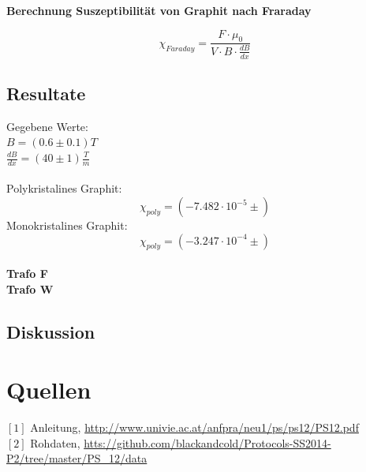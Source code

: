 \documentclass[12pt,a4paper]{article}
\begin{document}
\begin{multicols}{2}
\textbf{Berechnung Suszeptibilität von Graphit nach Fraraday}

$$\chi_{Faraday} = \frac{F \cdot \mu_0}{V \cdot B \cdot \frac{dB}{dx}}$$

\subsection{Resultate}
Gegebene Werte:\\
$B = (0.6 \pm 0.1)T$\\
$\frac{dB}{dx} = (40 \pm 1) \frac{T}{m}$\\
\\
Polykristalines Graphit:
$$\chi_{poly} = (-7.482 \cdot 10^{-5} \pm )$$
Monokristalines Graphit:
$$\chi_{poly} = (-3.247 \cdot 10^{-4} \pm )$$
\\
\textbf{Trafo F}\\

\textbf{Trafo W}\\


\subsection{Diskussion}



\section{Quellen}
$[1]$ Anleitung, \url{http://www.univie.ac.at/anfpra/neu1/ps/ps12/PS12.pdf}\\
$[2]$ Rohdaten, \url{htts://github.com/blackandcold/Protocols-SS2014-P2/tree/master/PS_12/data}\\

\end{multicols}
\end{document}
